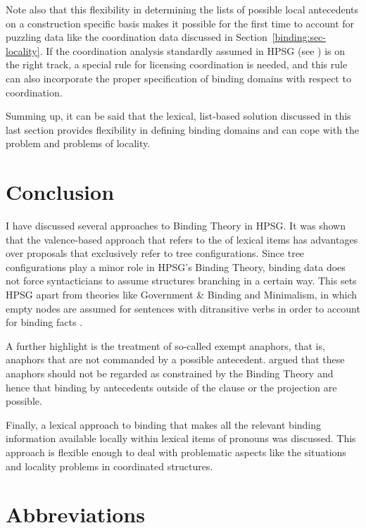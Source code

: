 \documentclass[output=paper,biblatex,babelshorthands,newtxmath,draftmode,colorlinks,citecolor=brown]{langscibook}
\begin{document}
Note also that this flexibility in determining the lists of possible local antecedents on a
construction specific basis makes it possible for the first time to account for puzzling data like
the coordination data discussed in Section~\ref{binding:sec-locality}. If the coordination analysis
standardly assumed in HPSG (see ) is on the right track, a special
rule for licensing coordination is needed, and this rule can also incorporate the proper
specification of binding domains with respect to coordination.


Summing up, it can be said that the lexical, list-based solution discussed in this last section
provides flexibility in defining binding domains and can cope with the \iwithini problem and
problems of locality. 


\section{Conclusion}

I have discussed several approaches to Binding Theory in HPSG. It was shown that the
valence-based approach that refers to the \argstl of lexical items has advantages over proposals
that exclusively refer to tree configurations. Since tree configurations play a minor role in HPSG's
Binding Theory, binding data does not force syntacticians to assume structures branching in a
certain way. This sets HPSG apart from theories like Government \& Binding and Minimalism, in which
empty nodes are assumed for sentences with ditransitive verbs in order to account for binding facts
\crossrefchapterp[\pageref{minimalism:page-binding-branching-start}--\pageref{minimalism:page-binding-branching-end}]{minimalism}. 

A further highlight is the treatment of so-called exempt anaphors, that is, anaphors that are not
commanded by a possible antecedent. \citet{PS92a}
argued that these anaphors should not be regarded
as constrained by the Binding Theory and hence that binding by antecedents outside of the clause or
the projection are possible.

Finally, a lexical approach to binding that makes all the relevant binding information
available locally within lexical items of pronouns was discussed. This approach is flexible enough to deal with
problematic aspects like the \iwithini situations and locality problems in coordinated structures.

\section*{Abbreviations}
\end{document}
